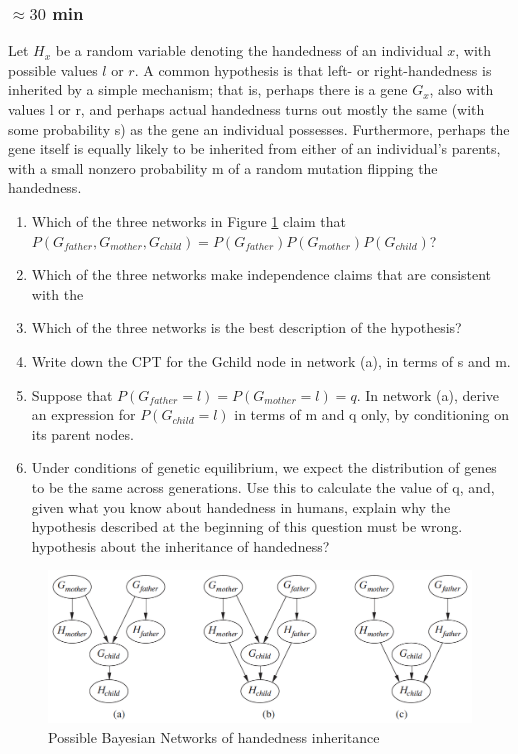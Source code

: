 \documentclass[a4paper, 10pt]{article}
\begin{document}
\subsubsection{$\approx 30$ min}
Let $H_x$ be a random variable denoting the handedness of an individual $x$, with possible
values $l$ or $r$. A common hypothesis is that left- or right-handedness is inherited by a simple
mechanism; that is, perhaps there is a gene $G_x$, also with values l or r, and perhaps actual
handedness turns out mostly the same (with some probability s) as the gene an individual
possesses. Furthermore, perhaps the gene itself is equally likely to be inherited from either
of an individual’s parents, with a small nonzero probability m of a random mutation flipping
the handedness.
\begin{enumerate}
    \item Which of the three networks in Figure \ref{fig:b_net} claim that\\ $P(G_{father},G_{mother},G_{child}) =
P(G_{father} )P(G_{mother} )P(G_{child} )$?
    \item Which of the three networks make independence claims that are consistent with the
    \item Which of the three networks is the best description of the hypothesis?
    \item Write down the CPT for the Gchild node in network (a), in terms of s and m.
    \item Suppose that $P(G_{father} =l) = P(G_{mother} =l) = q$. In network (a), derive an expression
for $P(G_{child} =l)$ in terms of m and q only, by conditioning on its parent nodes.
    \item Under conditions of genetic equilibrium, we expect the distribution of genes to be the
same across generations. Use this to calculate the value of q, and, given what you know
about handedness in humans, explain why the hypothesis described at the beginning of
this question must be wrong.
hypothesis about the inheritance of handedness?
\end{enumerate}
\begin{figure}[H]
    \centering
    \includegraphics[width=1.\textwidth]{figures/bnet.png}
    \caption{Possible Bayesian Networks of handedness inheritance}
    \label{fig:b_net}
\end{figure}
\end{document}
